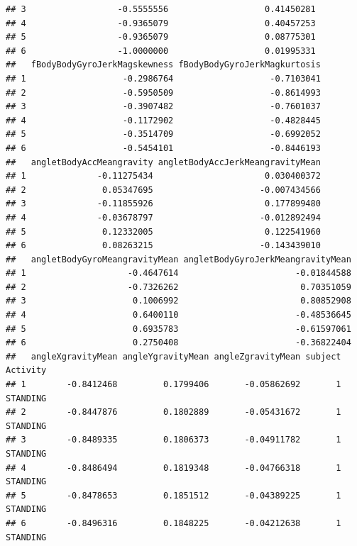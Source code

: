 \documentclass[
]{article}
\begin{document}
\begin{verbatim}
## 3                  -0.5555556                   0.41450281
## 4                  -0.9365079                   0.40457253
## 5                  -0.9365079                   0.08775301
## 6                  -1.0000000                   0.01995331
##   fBodyBodyGyroJerkMagskewness fBodyBodyGyroJerkMagkurtosis
## 1                   -0.2986764                   -0.7103041
## 2                   -0.5950509                   -0.8614993
## 3                   -0.3907482                   -0.7601037
## 4                   -0.1172902                   -0.4828445
## 5                   -0.3514709                   -0.6992052
## 6                   -0.5454101                   -0.8446193
##   angletBodyAccMeangravity angletBodyAccJerkMeangravityMean
## 1              -0.11275434                      0.030400372
## 2               0.05347695                     -0.007434566
## 3              -0.11855926                      0.177899480
## 4              -0.03678797                     -0.012892494
## 5               0.12332005                      0.122541960
## 6               0.08263215                     -0.143439010
##   angletBodyGyroMeangravityMean angletBodyGyroJerkMeangravityMean
## 1                    -0.4647614                       -0.01844588
## 2                    -0.7326262                        0.70351059
## 3                     0.1006992                        0.80852908
## 4                     0.6400110                       -0.48536645
## 5                     0.6935783                       -0.61597061
## 6                     0.2750408                       -0.36822404
##   angleXgravityMean angleYgravityMean angleZgravityMean subject Activity
## 1        -0.8412468         0.1799406       -0.05862692       1 STANDING
## 2        -0.8447876         0.1802889       -0.05431672       1 STANDING
## 3        -0.8489335         0.1806373       -0.04911782       1 STANDING
## 4        -0.8486494         0.1819348       -0.04766318       1 STANDING
## 5        -0.8478653         0.1851512       -0.04389225       1 STANDING
## 6        -0.8496316         0.1848225       -0.04212638       1 STANDING
\end{verbatim}
\end{document}
